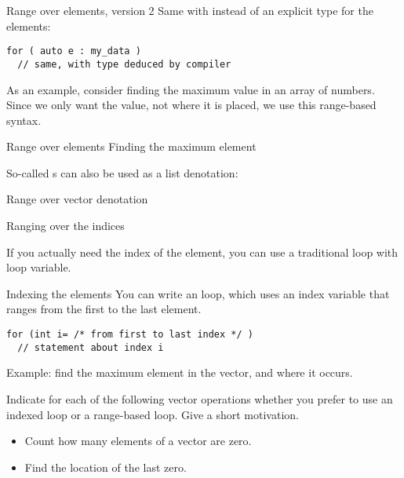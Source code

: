 \begin{block}{Range over elements, version 2}
  \label{sl:vector-range2}
  Same with  instead of
  an explicit type for the elements:
\begin{lstlisting}
for ( auto e : my_data )
  // same, with type deduced by compiler
\end{lstlisting}
\end{block}

As an example, consider finding the maximum value
in an array of numbers.
Since we only want the value, not where it is placed,
we use this range-based syntax.

\begin{block}{Range over elements}
  \label{sl:vector-range3}
  Finding the maximum element
\end{block}

So-called s
can also be used as a list denotation:

\begin{block}{Range over vector denotation}
  \label{sl:range-denote}
\end{block}

 {Ranging over the indices}

If you actually need the index of the element, you can use a
traditional  loop with loop variable.

\begin{block}{Indexing the elements}
  \label{sl:index-range}
  You can write an  loop, which uses an
  index variable that ranges from the first to the last element.
\begin{lstlisting}
for (int i= /* from first to last index */ )
  // statement about index i
\end{lstlisting}
Example: find the maximum element in the vector, and where it occurs.
%
\renewcommand\snippetcodefraction{.67}
\renewcommand\snippetanswfraction{.3}
\end{block}

\begin{exercise}
  \label{ex:range-for}
  Indicate for each of the following vector operations whether you
  prefer to use an indexed loop or a range-based loop. Give a short
  motivation.
  \begin{itemize}
  \item Count how many elements of a vector are zero.
  \item Find the location of the last zero.
  \end{itemize}
\end{exercise}

